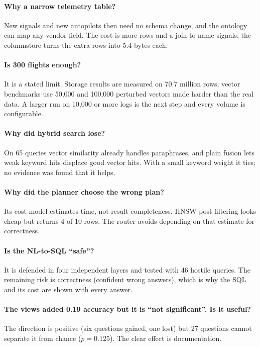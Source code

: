 \documentclass[11pt,a4paper]{article}
\begin{document}
\paragraph{Why a narrow telemetry table?}
New signals and new autopilots then need no schema change, and the ontology can map any vendor field. The cost is more rows and a join to name signals; the columnstore turns the extra rows into 5.4 bytes each.

\paragraph{Is 300 flights enough?}
It is a stated limit. Storage results are measured on 70.7 million rows; vector benchmarks use 50,000 and 100,000 perturbed vectors made harder than the real data. A larger run on 10,000 or more logs is the next step and every volume is configurable.

\paragraph{Why did hybrid search lose?}
On 65 queries vector similarity already handles paraphrases, and plain fusion lets weak keyword hits displace good vector hits. With a small keyword weight it ties; no evidence was found that it helps.

\paragraph{Why did the planner choose the wrong plan?}
Its cost model estimates time, not result completeness. HNSW post-filtering looks cheap but returns 4 of 10 rows. The router avoids depending on that estimate for correctness.

\paragraph{Is the NL-to-SQL ``safe''?}
It is defended in four independent layers and tested with 46 hostile queries. The remaining risk is correctness (confident wrong answers), which is why the SQL and its cost are shown with every answer.

\paragraph{The views added 0.19 accuracy but it is ``not significant''. Is it useful?}
The direction is positive (six questions gained, one lost) but 27 questions cannot separate it from chance ($p=0.125$). The clear effect is documentation.
\end{document}
